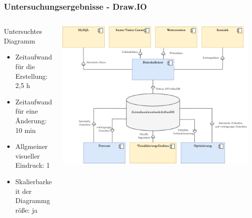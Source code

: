 \documentclass[xcolor=dvipsnames]{beamer}
\begin{document}
\begin{frame}
	\frametitle{Untersuchungsergebnisse - Draw.IO}
	\begin{columns}
	
		
		\begin{column}{0.35\textwidth}
			\begin{block}{Untersuchtes Diagramm}
				\begin{block}{}
					\begin{itemize}
						\item Zeitaufwand für die Erstellung: 2,5 h
						\item Zeitaufwand für eine Änderung: 10 min
						\item Allgmeiner visueller Eindruck: 1
						\item Skalierbarkeit der Diagrammgröße: ja
						
					\end{itemize}
					
				\end{block}
				
			\end{block}
		\end{column}
	
		\begin{column}{0.75\textwidth}
		\begin{minipage}{\textwidth}
			\includegraphics[scale=0.029]{../Diagramms/DrawIO/uml.PNG}
		\end{minipage}
	\end{column}
	\end{columns}
\end{frame}
\end{document}
